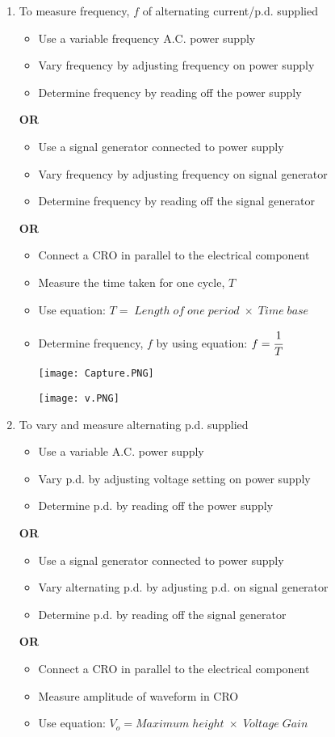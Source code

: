 \documentclass{article}
\begin{document}
\begin{enumerate}
\item To measure frequency, $f$ of alternating current/p.d. supplied
\begin{itemize}
    \item Use a variable frequency A.C. power supply
\item  Vary frequency by adjusting frequency on power supply
\item Determine frequency by reading off the power supply
\end{itemize}
\textbf{OR}
\begin{itemize}
    \item Use a signal generator connected to power supply
\item Vary frequency by adjusting frequency on signal generator
\item Determine frequency by reading off the signal generator
\end{itemize}
\textbf{OR}
\begin{itemize}
    \item Connect a CRO in parallel to the electrical component
\item Measure the time taken for one cycle, $T$
\item Use equation: $T= \; Length \; of \;one \; period \;\times \; Time\; base$
\item Determine frequency, $f$ by using equation: $f=\cfrac{1}{T}$\\
\begin{minipage}[t]{0.5\textwidth}
\texttt{[image: Capture.PNG]}
\end{minipage}
\begin{minipage}[t]{0.5\textwidth}
 \texttt{[image: v.PNG]}
\end{minipage}
\end{itemize}

\item To vary and measure alternating p.d. supplied

 \begin{itemize}
     \item Use a variable A.C. power supply
\item Vary p.d. by adjusting voltage setting on power supply
\item Determine p.d. by reading off the power supply
 \end{itemize}
\textbf{OR}
\begin{itemize}
    \item Use a signal generator connected to power supply
\item Vary alternating p.d. by adjusting p.d. on signal generator
\item Determine p.d. by reading off the signal generator
\end{itemize}
\textbf{OR}
\begin{itemize}
    \item Connect a CRO in parallel to the electrical component
\item  Measure amplitude of waveform in CRO
\item Use equation: $V_o=Maximum \; height \;\times\; Voltage\; Gain$
\end{itemize}


\end{enumerate}
\end{document}

